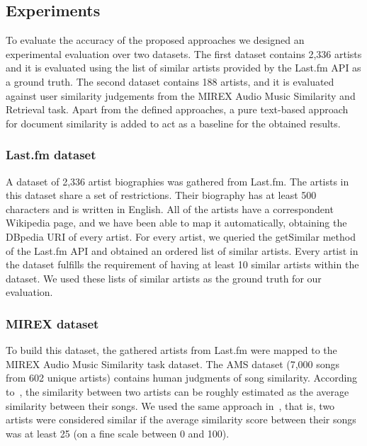 \subsection{Experiments}
\label{sec:similarity:experimentalsetup}

To evaluate the accuracy of the proposed approaches we designed an experimental evaluation over two datasets. The first dataset contains 2,336 artists and it is evaluated using the list of similar artists provided by the Last.fm API as a ground truth. The second dataset contains 188 artists, and it is evaluated against user similarity judgements from the MIREX Audio Music Similarity and Retrieval task.
Apart from the defined approaches, a pure text-based approach for document similarity is added to act as a baseline for the obtained results.


\subsubsection{Last.fm dataset}\label{sec:similarity:lastfm_dataset}

A dataset of 2,336 artist biographies was gathered from Last.fm. The artists in this dataset share a set of restrictions.
Their biography has at least 500 characters and is written in English.
All of the artists have a correspondent Wikipedia page, and we have been able to map it automatically, obtaining the DBpedia URI of every artist.
For every artist, we queried the getSimilar method of the Last.fm API and obtained an ordered list of similar artists. Every artist in the dataset fulfills the requirement of having at least 10 similar artists within the dataset.
We used these lists of similar artists as the ground truth for our evaluation.

\subsubsection{MIREX dataset} %

To build this dataset, the gathered artists from Last.fm
were mapped to the MIREX Audio Music Similarity task dataset. The AMS dataset (7,000 songs from 602 unique artists) contains human judgments of song similarity. According to~\cite{Schedl2013}, the similarity between two artists can be roughly estimated as the average similarity between their songs. We used the same approach in~\cite{Schedl2013}, that is, two artists were considered similar if the average similarity score between their songs was at least 25 (on a fine scale between 0 and 100).

